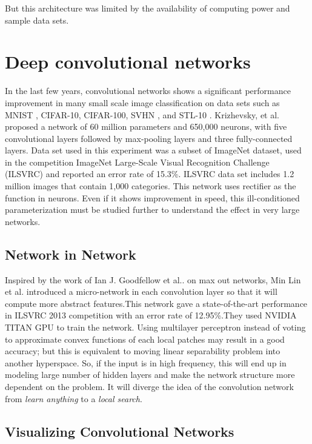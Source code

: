 \documentclass{article}
\begin{document}
But this architecture was limited by the availability of computing power and  sample data sets. 

\section {Deep convolutional networks}
In the last few years, convolutional networks shows a significant performance improvement in many small scale image classification on data sets  such as MNIST \cite{Ciresan:2012g}, CIFAR-10, CIFAR-100, SVHN \cite{lee2014deeply}, and STL-10 \cite{deepfwd}. Krizhevsky, et al. \cite{Krizhevsky2012a} proposed a network  of 60 million parameters and 650,000 neurons, with five convolutional layers followed by max-pooling layers and three fully-connected layers. Data set used in this experiment was a subset of ImageNet dataset, used in the competition ImageNet Large-Scale Visual Recognition Challenge (ILSVRC) \cite{imagenet} and reported an error rate of 15.3\%. ILSVRC data set includes 1.2 million images that contain 1,000 categories. This network uses rectifier  as the function in neurons.  Even if it shows improvement in speed, this  ill-conditioned parameterization must be studied further to understand the effect in very large networks.



\subsection{Network in Network }
Inspired by the work of Ian J. Goodfellow et al..\cite{Goodfellow2013} on max out networks,  Min Lin et al. \cite{Lin2013} introduced a micro-network in each convolution layer so that it will compute more abstract features.This network gave a state-of-the-art performance in  ILSVRC 2013 competition with an error rate of 12.95\%.They used NVIDIA TITAN GPU to train the network. Using multilayer perceptron instead of voting to approximate convex functions of each  local patches may result in a good accuracy; but this is equivalent to moving linear separability problem into another hyperspace. So, if the input is in high frequency, this will end up in modeling large number of hidden layers and make the network structure more dependent on the problem. It will diverge the idea of the convolution network from \emph{learn anything} to a \emph{local search}.

\subsection{Visualizing Convolutional Networks}
\end{document}
